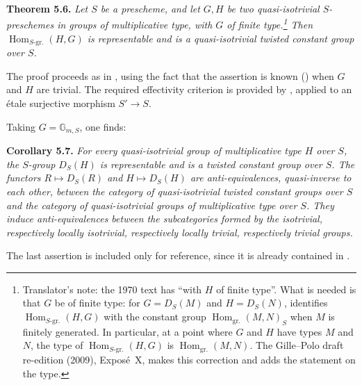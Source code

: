 \par\medskip\noindent
\textbf{Theorem 5.6.}\enspace
\begingroup\itshape
Let \(S\) be a prescheme, and let \(G,H\) be two quasi-isotrivial
\(S\)-preschemes in groups of multiplicative type, with \(G\) of finite
type.\footnote{Translator's note: the 1970 text has ``with \(H\) of finite
type''. What is needed is that \(G\) be of finite type: for \(G=D_S(M)\) and
\(H=D_S(N)\),  identifies \(\operatorname{Hom}_{S\text{-gr.}}(H,G)\)
with the constant group \(\operatorname{Hom}_{\mathrm{gr.}}(M,N)_S\) when
\(M\) is finitely generated. In particular, at a point where \(G\) and \(H\)
have types \(M\) and \(N\), the type of
\(\operatorname{Hom}_{S\text{-gr.}}(H,G)\) is
\(\operatorname{Hom}_{\mathrm{gr.}}(M,N)\). The Gille--Polo draft re-edition
(2009), Expos\'e~X, makes this correction and adds the statement on the
type.} Then \(\operatorname{Hom}_{S\text{-gr.}}(H,G)\) is representable and
is a quasi-isotrivial twisted constant group over \(S\).
\par\endgroup

The proof proceeds as in , using the fact that the assertion is known
() when \(G\) and \(H\) are trivial. The required effectivity
criterion is provided by , applied to an étale surjective morphism
\(S'\to S\).

Taking \(G=\mathbb G_{m,S}\), one finds:

\par\medskip\noindent
\textbf{Corollary 5.7.}\enspace
\begingroup\itshape
For every quasi-isotrivial group of multiplicative type \(H\) over \(S\),
the \(S\)-group \(D_S(H)\) is representable and is a twisted constant group
over \(S\). The functors \(R\mapsto D_S(R)\) and \(H\mapsto D_S(H)\) are
anti-equivalences, quasi-inverse to each other, between the category of
quasi-isotrivial twisted constant groups over \(S\) and the category of
quasi-isotrivial groups of multiplicative type over \(S\). They induce
anti-equivalences between the subcategories formed by the isotrivial,
respectively locally isotrivial, respectively locally trivial, respectively
trivial groups.
\par\endgroup

The last assertion is included only for reference, since it is already
contained in .

